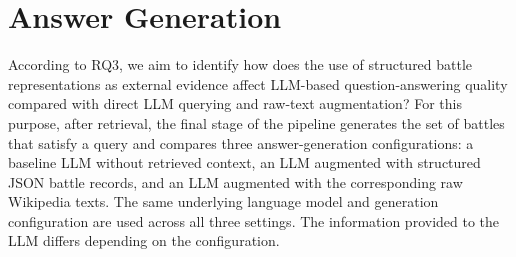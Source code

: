 \section{Answer Generation}
According to RQ3, we aim to identify how does the use of structured battle representations as external evidence affect LLM-based question-answering quality compared with direct LLM querying and raw-text augmentation? For this purpose, after retrieval, the final stage of the pipeline generates the set of battles that satisfy a query and compares three answer-generation configurations: a baseline LLM without retrieved context, an LLM augmented with structured JSON battle records, and an LLM augmented with the corresponding raw Wikipedia texts. The same underlying language model and generation configuration are used across all three settings. The information provided to the LLM differs depending on the configuration.

